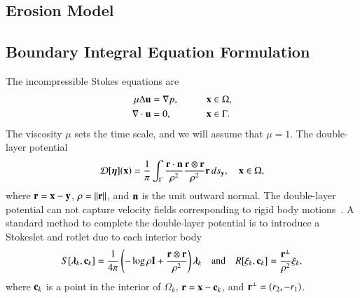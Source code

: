 \documentclass[preprint, 10pt]{elsarticle}
\begin{document}
\subsection{Erosion Model} 


\subsection{Boundary Integral Equation Formulation} 
The incompressible Stokes equations are
\begin{alignat*}{3}
  \mu\Delta {\mathbf{u}} &= {\nabla} p, \qquad && {\mathbf{x}} \in \Omega, \\
  {\nabla} \cdot {\mathbf{u}} &= 0,   && {\mathbf{x}} \in \Gamma.
\end{alignat*}
The viscosity $\mu$ sets the time scale, and we will assume that
$\mu=1$.  The double-layer potential 
\begin{align}
  {\mathcal{D}}[{\boldsymbol\eta}]({\mathbf{x}}) = \frac{1}{\pi} \int_{\Gamma} 
    \frac{{\mathbf{r}} \cdot {\mathbf{n}}}{\rho^2} \frac{{\mathbf{r}} \otimes {\mathbf{r}}}{\rho^2} 
    {\mathbf{r}} \, ds_{\mathbf{y}}, \quad {\mathbf{x}} \in \Omega,
    \label{eqn:dlp}
\end{align}
where ${\mathbf{r}} = {\mathbf{x}} - {\mathbf{y}}$, $\rho = \|{\mathbf{r}}\|$, and ${\mathbf{n}}$ is the unit outward
normal.  The double-layer potential can not capture velocity fields
corresponding to rigid body motions~\cite{pow-mir1987}.  A standard
method to complete the double-layer potential is to introduce a
Stokeslet and rotlet due to each interior body
\begin{align}
  S[{\boldsymbol\lambda}_k,{\mathbf{c}}_k] = \frac{1}{4\pi} \left(-\log \rho {\mathbf{I}} + 
    \frac{{\mathbf{r}} \otimes {\mathbf{r}}}{\rho^2} \right){\boldsymbol\lambda}_k
  \quad \text{and} \quad
  R[\xi_k,{\mathbf{c}}_k] = \frac{{\mathbf{r}}^\perp}{\rho^2}\xi_k,
  \label{eqn:stokeslet_rotlet}
\end{align}
where ${\mathbf{c}}_k$ is a point in the interior of $\Omega_k$, ${\mathbf{r}} = {\mathbf{x}} -
{\mathbf{c}}_k$, and ${\mathbf{r}}^\perp = (r_2,-r_1)$.  
\end{document}
